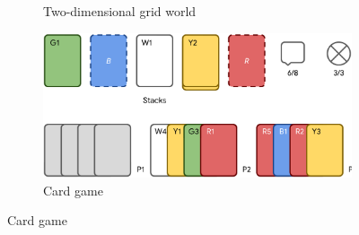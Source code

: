 \begin{figure}[h]
\begin{subfigure}[c]{0.23\textwidth}
        \caption{Two-dimensional grid world}
        \label{fig:lbf1}
    \end{subfigure}
    \hfill
    \begin{subfigure}[c]{0.4\textwidth}
        \centering
        \includegraphics[width=\textwidth]{Figures/MADRL/hanabi.png}
        \caption{Card game}
    \end{subfigure}
    

\end{figure}
